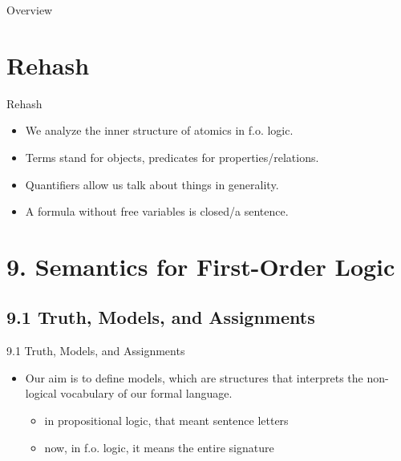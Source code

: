 
\begin{frame}
  \maketitle
\end{frame}

\begin{frame}{Overview}
  \setcounter{framenumber}{249}
  \tableofcontents
\end{frame}

\section{Rehash}
\begin{frame}{Rehash}
	
	\begin{itemize}%
	\itemsep=16pt
	
		\item We analyze the inner structure of atomics in f.o. logic.
		
		\item  Terms stand for objects, predicates for properties/relations.
		
		\item Quantifiers allow us talk about things in generality.
		
		\item A formula without free variables is closed/a sentence.
							
	\end{itemize}

\end{frame}
		

\section{9. Semantics for First-Order Logic}
\subsection{9.1 Truth, Models, and Assignments}

\begin{frame}{9.1 Truth, Models, and Assignments}

	\begin{itemize}%
	\itemsep=16pt
		
		\item Our aim is to define models, which are structures that interprets the non-logical vocabulary of our formal language.
		
		\begin{itemize}
			
			\item in propositional logic, that meant sentence letters
			
			\item now, in f.o. logic, it means the entire signature
		
		\end{itemize}
		
	\end{itemize}

\end{frame}


